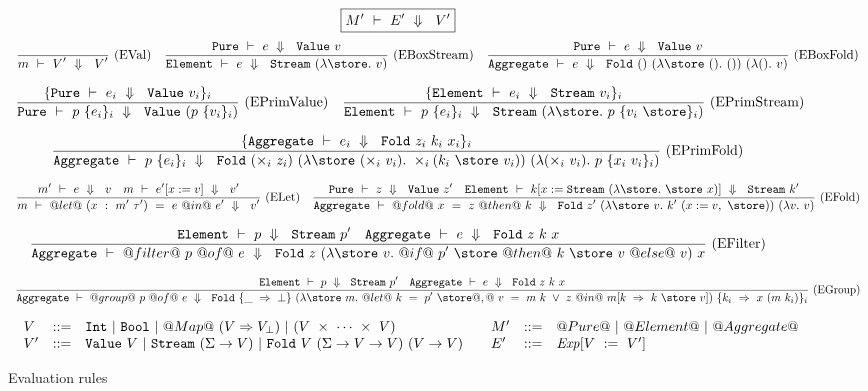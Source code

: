 
\begin{figure*}

$$
\boxed{M'~\vdash~E'~\Downarrow~~V'}
$$
$$
\ruleAx
{
    \SourceStepX{m}{V'}{V'}
}{EVal}
\ruleIN
{
    \SourceStepXP{e}{\VValue{v}}
}
{
    \SourceStepXE{e}{\VStream{(\lam{\store} v)}}
}{EBoxStream}
\ruleIN
{
    \SourceStepXP{e}{\VValue{v}}
}
{
    \SourceStepXA{e}{\VFold{()}{(\lam{\store~()} ())}{(\lam{()} v)}}
}{EBoxFold}
$$

$$
\ruleIN
{
  \{ \SourceStepXP{e_i}{\VValue{v_i}} \}_i
}
{
  \SourceStepXP
    {p~\{ e_i \}_i }
    {\VValue{(p~\{v_i\}_i)}}
}{EPrimValue}
\ruleIN
{
  \{ \SourceStepXE{e_i}{\VStream{v_i}} \}_i
}
{
  \SourceStepXE
    {p~\{ e_i \}_i }
    {\VStream{(\lam{\store} p~\{v_i~\store\}_i)}}
}{EPrimStream}
$$

$$
\ruleIN
{
  \{ \SourceStepXA{e_i}{\VFold{z_i}{k_i}{x_i}} \}_i
}
{
  \SourceStepXA
    {p~\{ e_i \}_i }
    {\VFold
      {(\times_i~z_i)}
      {(\lam{\store~(\times_i~v_i)}
        \times_i (k_i~\store~v_i))}
      {(\lam{(\times_i~v_i)}
        p~\{x_i~v_i\}_i)}}
}{EPrimFold}
$$

$$
\ruleIN
{
  \SourceStepX{m'}{e}{v}
  \quad
  \SourceStepX{m}{e'[x:=v]}{v'}
}
{
  \SourceStepX
    {m}
    {@let@~(x~:~m'~\tau')~=~e~@in@~e'}
    {v'}
}{ELet}
\ruleIN
{
  \SourceStepXP{z}{\VValue{z'}}
  \quad
  \SourceStepXE{k[x:=\VStream{(\lam{\store} \store~x)}]}{\VStream{k'}}
}
{
  \SourceStepXA
    {@fold@~x~=~z~@then@~k}
    {\VFold
      {z'}
      {(\lam{\store~v} k'~(x:=v,~\store))}
      {(\lam{v} v)}}
}{EFold}
$$

$$
\ruleIN
{
  \SourceStepXE{p}{\VStream{p'}}
  \quad
  \SourceStepXA{e}{\VFold{z}{k}{x}}
}
{
  \SourceStepXA
    {@filter@~p~@of@~e}
    {\VFold
      {z}
      {(\lam{\store~v}
         @if@~p'~\store~@then@~k~\store~v~@else@~v)}
      {x}}
}{EFilter}
$$

$$
\ruleIN
{
  \SourceStepXE{p}{\VStream{p'}}
  \quad
  \SourceStepXA{e}{\VFold{z}{k}{x}}
}
{
  \SourceStepXA
    {@group@~p~@of@~e}
    {\VFold
      {\{\_~\Rightarrow~\bot\}}
      {(\lam{\store~m}
        @let@~k~=~p'~\store@,@~
              v~=~m~k~\vee~z
        ~@in@~
          m[k~\Rightarrow~k~\store~v])}
      {\{k_i~\Rightarrow~x~(m~k_i)\}_i}}
}{EGroup}
$$

$$
\begin{array}{ll}

\begin{array}{lll}
V & ::= & \NN~|~\BB~|~@Map@~(V \Rightarrow V_\bot)~|~(V~\times~\cdots~\times~V) \\
V'& ::= & \VValue{V}~|~\VStream{(\Sigma \to V)}~|~\VFold{V}{(\Sigma \to V \to V)}{(V \to V)}
\end{array}

&

\begin{array}{lll}
M'& ::= & @Pure@~|~@Element@~|~@Aggregate@ \\
E'& ::= & \mi{Exp}[V~:=~V']
\end{array}

\end{array}
$$


\caption{Evaluation rules}
\label{fig:source:eval}
\end{figure*}


